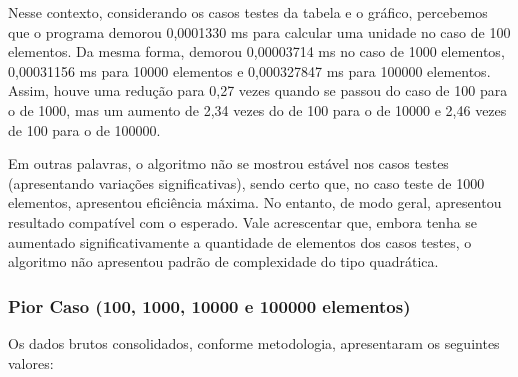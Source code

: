 \documentclass[a4paper, 12pt]{article}
\begin{document}
Nesse contexto, considerando os casos testes da tabela e o gráfico, percebemos que o programa demorou 0,0001330 ms para calcular uma unidade no caso de 100 elementos. Da mesma forma, demorou 0,00003714 ms no caso de 1000 elementos, 0,00031156 ms para 10000 elementos e 0,000327847 ms para 100000 elementos. Assim, houve uma redução para 0,27 vezes quando se passou do caso de 100 para o de 1000, mas um aumento de  2,34 vezes do de 100 para o de 10000 e 2,46 vezes de 100 para o de 100000.

Em outras palavras, o algoritmo não se mostrou estável nos casos testes (apresentando variações significativas), sendo certo que, no caso teste de 1000 elementos, apresentou eficiência máxima. No entanto, de modo geral, apresentou resultado compatível com o esperado. Vale acrescentar que, embora tenha se aumentado significativamente a quantidade de elementos dos casos testes, o algoritmo não apresentou padrão de complexidade do tipo quadrática.

\subsubsection{Pior Caso (100, 1000, 10000 e 100000 elementos)}

\tab{ }Os dados brutos consolidados, conforme metodologia, apresentaram os seguintes valores:
\vspace{0.5cm}
\end{document}
